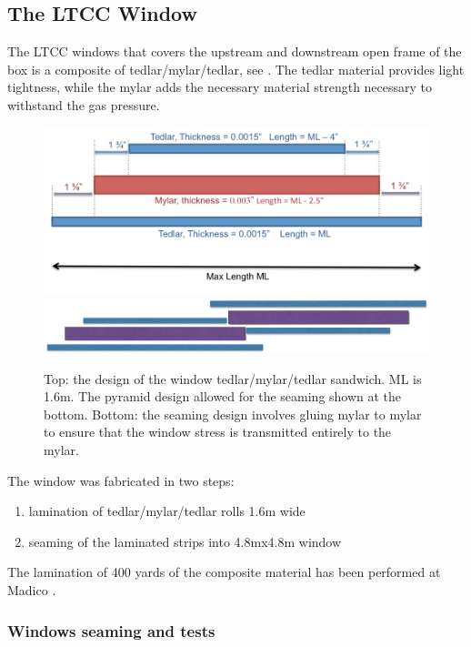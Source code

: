 \subsection{The LTCC Window}

The LTCC windows that covers the upstream and downstream open frame of the box is a composite of tedlar/mylar/tedlar, see . The tedlar
material provides light tightness, while the mylar adds the necessary material strength necessary to withstand the gas pressure.

\begin{figure}
	\centering
	\includegraphics[width=1.0\columnwidth,keepaspectratio]{img/windowDesign.png}
	\includegraphics[width=1.0\columnwidth,keepaspectratio]{img/windowSeaming.png}
\caption{Top: the design of the window tedlar/mylar/tedlar sandwich. ML is 1.6m. The pyramid design allowed for the seaming shown at the bottom.
			Bottom: the seaming design involves gluing mylar to mylar to ensure that the window stress is transmitted entirely to the mylar. }
	\label{fig:windowDesign}
\end{figure}


The window was fabricated in two steps:

\begin{enumerate}
	\item lamination of tedlar/mylar/tedlar rolls 1.6m  wide
	\item seaming of the laminated strips into 4.8mx4.8m window
\end{enumerate}

The lamination of 400 yards of the composite material has been performed at Madico \cite{madico}.

\subsubsection{Windows seaming and tests}


